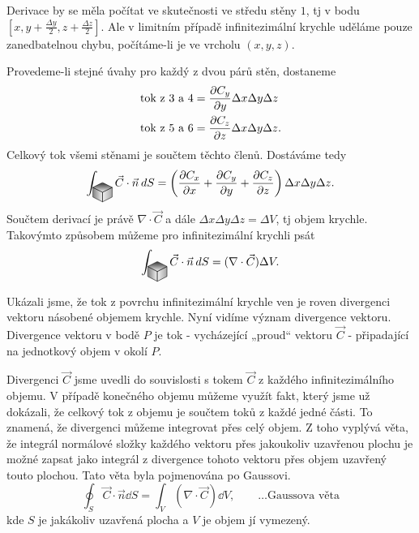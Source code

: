     Derivace by se měla počítat ve skutečnosti ve středu stěny $1$, tj v bodu $[x, y+\frac{\Delta 
    y}{2}, z + \frac{\Delta z}{2}]$. Ale v limitním případě infinitezimální krychle uděláme pouze 
    zanedbatelnou chybu, počítáme-li je ve vrcholu $(x,y,z)$.
    
    Provedeme-li stejné úvahy pro každý z dvou párů stěn, dostaneme    
    \begin{align*}
     \text{tok z 3 a 4} &= \frac{\partial C_y}{\partial y}\Delta x\Delta y\Delta z   \\ 
     \text{tok z 5 a 6} &= \frac{\partial C_z}{\partial z}\Delta x\Delta y\Delta z.
    \end{align*}       
    Celkový tok všemi stěnami je součtem těchto členů. Dostáváme tedy
    \begin{equation}
     \int_{\cube}\vec{C}\cdot\vec{n}\dd{S}
        = \left(\pder{C_x}{x}+\pder{C_y}{y} +
          \pder{C_z}{z}\right)\Delta x\Delta y \Delta z.
    \end{equation}
    Součtem derivací je právě $\nabla\cdot\vec{C}$ a dále $\Delta x\Delta y \Delta z = \Delta V$, 
    tj objem krychle. Takovýmto způsobem můžeme pro infinitezimální krychli psát
    \begin{equation}
     \int_{\cube}\vec{C}\cdot\vec{n}\dd{S}
       = (\nabla\cdot\vec{C})\Delta V.       \label{FYZ:eq_gauss1}
    \end{equation}
    
    Ukázali jsme, že tok z povrchu infinitezimální krychle ven je roven divergenci vektoru násobené 
    objemem krychle. Nyní vidíme význam divergence vektoru. Divergence vektoru v bodě \(P\) je tok - 
    vycházející „proud“ vektoru $\vec{C}$ - připadající na jednotkový objem v okolí \(P\).
    
    Divergenci \(\vec{C}\) jsme uvedli do souvislosti s tokem \(\vec{C}\) z každého 
    infinitezimálního objemu. V případě konečného objemu můžeme využít fakt, který jsme už dokázali, 
    že celkový tok z objemu je součtem toků z každé jedné části. To znamená, že divergenci můžeme 
    integrovat přes celý objem. Z toho vyplývá věta, že integrál normálové složky každého vektoru 
    přes jakoukoliv uzavřenou plochu je možné zapsat jako integrál z divergence tohoto vektoru přes 
    objem uzavřený touto plochou. Tato věta byla pojmenována po Gaussovi.
    \begin{equation}\label{FYZ:eq_gauss_veta}
     \oint_S \vec{C}\cdot\vec{n}\dd{S} 
       = \int_V (\nabla\cdot\vec{C})\dd{V}, \qquad\ldots\text{Gaussova věta}
    \end{equation}
    kde $S$ je jakákoliv uzavřená plocha a $V$ je objem jí vymezený.
    
